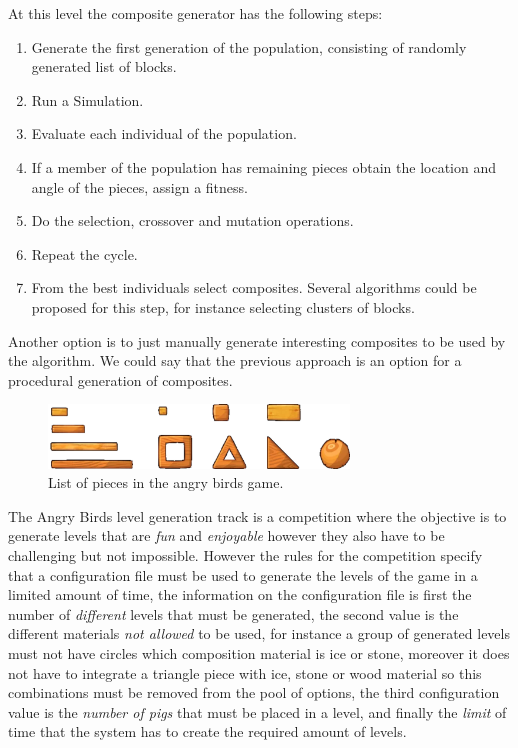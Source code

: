 \documentclass[conference]{IEEEtran}
\begin{document}
    At this level the composite generator has the following steps:
    \begin{enumerate}
    \item Generate the first generation of the population, consisting of
    randomly generated list of blocks.
    \item Run a Simulation.
    \item Evaluate each individual of the population.
    \item If a member of the population has remaining pieces obtain the location
    and angle of the pieces, assign a fitness.
    \item Do the selection, crossover and mutation operations.
    \item Repeat the cycle.
    \item From the best individuals select composites. Several algorithms could
    be proposed for this step, for instance selecting clusters of blocks.
    \end{enumerate}
    
    Another option is to just manually generate interesting composites to be used by the algorithm.
    We could say that the previous approach is an option for a procedural generation of composites.

    \begin{figure}[htbp]
    \centerline{\includegraphics[width=80mm]{Images/list_pieces.png}}
    \caption{List of pieces in the angry birds game.}
    \label{piece_list}
    \end{figure}
    The Angry Birds level generation track is a competition where the objective is 
    to generate levels that are \textit{fun} and \textit{enjoyable} however they 
    also have to be challenging but not impossible. However the rules for the competition 
    specify that a configuration file must be used to
    generate the levels of the game in a limited amount of time, the information on
    the configuration file is first the number of \textit{different} levels
    that must be generated, the second value is the different materials \textit{not
    allowed} to be used, for instance a group of generated levels must not have
    circles which composition material is ice or stone, moreover it does not have to
    integrate a triangle piece with ice, stone or wood material so this combinations
    must be removed from the pool of options, the third configuration value is the
    \textit{number of pigs} that must be placed in a level, and finally the
    \textit{limit} of time that the system has to create the required amount of
    levels.
    
\end{document}
